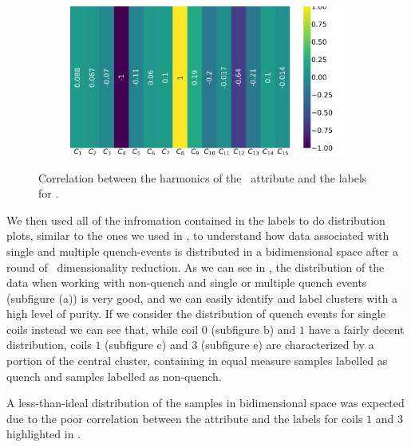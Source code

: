 \begin{figure}[!h]
\begin{subfigure}{0.49\linewidth}
	\end{subfigure}
	\begin{subfigure}{0.49\linewidth}
		\includegraphics[width=\linewidth]{img/qlp_corr/An_coil3.png}
	\end{subfigure}
	\caption{Correlation between the harmonics of the \an\ attribute and the labels for \qlp.}
	\label{fig:an-lcorr-qlp}
\end{figure}

We then used all of the infromation contained in the labels to do distribution plots, similar to the
ones we used in , to understand how data associated with single and multiple
quench-events is distributed in a bidimensional space after a round of \pca\ dimensionality
reduction. As we can see in , the distribution of the data when working with
non-quench and single or multiple quench events (subfigure (a)) is very good, and we can easily
identify and label clusters with a high level of purity. If we consider the distribution of
quench events for single coils instead we can see that, while coil $0$ (subfigure b) and $1$ have a
fairly decent distribution, coils $1$ (subfigure c) and $3$ (subfigure e) are characterized by a
portion of the central cluster, containing in equal measure samples labelled as quench and samples
labelled as non-quench.

A less-than-ideal distribution of the samples in bidimensional space was expected due to the poor
correlation between the attribute and the labels for coils $1$ and $3$ highlighted in .

